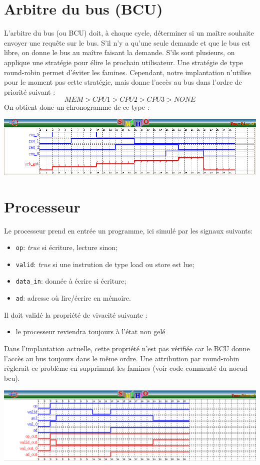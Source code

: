 \documentclass[a4paper, 11pt]{article}
\begin{document}
\section{Arbitre du bus (BCU)}
L'arbitre du bus (ou BCU) doit, à chaque cycle, déterminer si un maître souhaite
envoyer une requête sur le bus. S'il n'y a qu'une seule demande et que le bus est
libre, on donne le bus au maître faisant la demande. S'ils sont plusieurs, on
applique une stratégie pour élire le prochain utilisateur. Une stratégie de type
round-robin permet d'éviter les famines. Cependant, notre implantation n'utilise
pour le moment pas cette stratégie, mais donne l'accès au bus dans l'ordre de 
priorité suivant :
\[
MEM > CPU1 > CPU2 > CPU3 > NONE
\]
On obtient donc un chronogramme de ce type :
\begin{center}
\centerline{\includegraphics[scale=0.6]{images/bcu.png}}
\end{center}

\section{Processeur}
Le processeur prend en entrée un programme, ici simulé par les signaux suivants:
\begin{itemize}
  \item \texttt{op}: \textit{true} si écriture, lecture sinon;
  \item \texttt{valid}: \textit{true} si une instrution de type load ou store 
    est lue;
  \item \texttt{data\_in}: donnée à écrire si écriture;
  \item \texttt{ad}: adresse où lire/écrire en mémoire.
\end{itemize}
Il doit validé la propriété de vivacité suivante :
\begin{itemize}
  \item le processeur reviendra toujours à l'état non gelé
\end{itemize}
Dans l'implantation actuelle, cette propriété n'est pas vérifiée car le BCU
donne l'accès au bus toujours dans le même ordre. Une attribution par 
round-robin règlerait ce problème en supprimant les famines (voir code 
commenté du noeud bcu).
\begin{center}
\centerline{\includegraphics[scale=0.6]{images/proc.png}}
\end{center}
\end{document}
